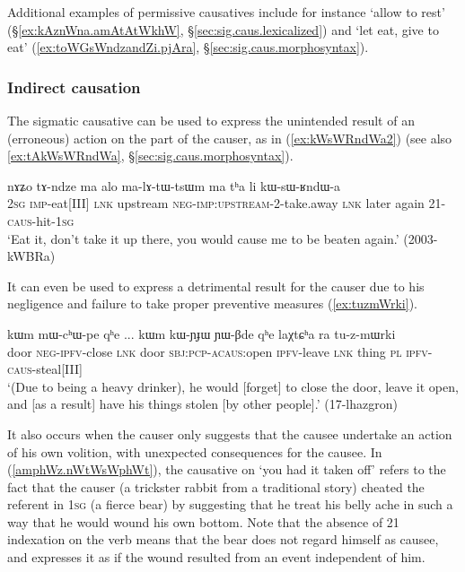 Additional examples of permissive causatives include for instance   `allow to rest' (§\ref{ex:kAznWna.amAtAtWkhW}, §\ref{sec:sig.caus.lexicalized}) and  `let eat, give to eat' (\ref{ex:toWGsWndzandZi.pjAra}, §\ref{sec:sig.caus.morphosyntax}).
 
\subsubsection{Indirect causation} \label{sec:sig.caus.indirect}
The sigmatic causative can be used to express the unintended result of an (erroneous) action on the part of the causer,  as in (\ref{ex:kWsWRndWa2}) (see also \ref{ex:tAkWsWRndWa}, §\ref{sec:sig.caus.morphosyntax}).

\begin{exe}
\ex \label{ex:kWsWRndWa2}
\gll  nɤʑo tɤ-ndze ma alo ma-lɤ-tɯ-tsɯm ma tʰa li kɯ-sɯ-ʁndɯ-a \\
\textsc{2sg} \textsc{imp}-eat[III] \textsc{lnk} upstream \textsc{neg}-\textsc{imp}:\textsc{upstream}-2-take.away \textsc{lnk} later again 2\fl{}1-\textsc{caus}-hit-\textsc{1sg} \\
\glt  `Eat it, don't take it up there, you would cause me to be beaten again.' (2003-kWBRa)
\end{exe}

It can even be used to express a detrimental result for the causer due to his negligence and failure to take proper preventive measures (\ref{ex:tuzmWrki}).

\begin{exe}
	\ex \label{ex:tuzmWrki}
	\gll kɯm mɯ-cʰɯ-pe qʰe ... kɯm kɯ-ɲɟɯ ɲɯ-βde qʰe laχtɕʰa ra tu-z-mɯrki \\
	door \textsc{neg}-\textsc{ipfv}-close \textsc{lnk} {  } door \textsc{sbj}:\textsc{pcp}-\textsc{acaus}:open \textsc{ipfv}-leave \textsc{lnk} thing \textsc{pl} \textsc{ipfv}-\textsc{caus}-steal[III] \\
	\glt  `(Due to being a heavy drinker), he would [forget] to close the door, leave it open, and [as a result] have his things stolen [by other people].' (17-lhazgron)
\end{exe}

It also occurs when the causer only suggests that the causee undertake an action of his own volition, with unexpected consequences for the causee. In (\ref{amphWz.nWtWsWphWt}), the causative on  `you had it taken off' refers to the fact that the causer (a trickster rabbit from a traditional story) cheated the referent in \textsc{1sg} (a fierce bear) by suggesting that he treat his belly ache in such a way that he would wound his own bottom. Note that the absence of 2\fl{}1 indexation on the verb  means that the bear does not regard himself as causee, and expresses it as if the wound resulted from an event independent of him.

